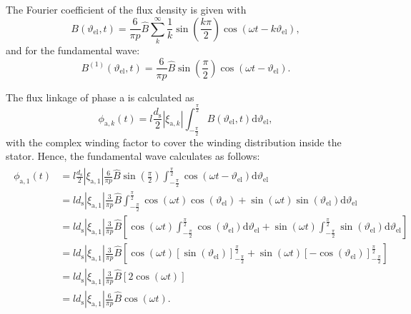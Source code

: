 \begin{solutionblock}
    The Fourier coefficient of the flux density is given with
    \begin{equation}
        B(\vartheta_{\mathrm{el}},t) = \frac{6}{\pi p} \hat{B} \sum_{k}^{\infty} \frac{1}{k} \sin\left(\frac{k\pi}{2} \right) \cos(\omega t - k \vartheta_{\mathrm{el}}),
    \end{equation}
    and for the fundamental wave:
    \begin{equation}
        B^{(1)}(\vartheta_{\mathrm{el}},t) = \frac{6}{\pi p} \hat{B} \sin\left(\frac{\pi}{2}\right) \cos(\omega t - \vartheta_{\mathrm{el}}).
    \end{equation}

    The flux linkage of phase a is calculated as
    \begin{equation}
        \phi_{\mathrm{a,}k}(t) = l \frac{d_{\mathrm{s}}}{2} |\xi_{\mathrm{a},k}| \int_{-\frac{\pi}{2}}^{\frac{\pi}{2}} B(\vartheta_{\mathrm{el}},t) \mathrm{d}\vartheta_{\mathrm{el}},
        \label{eq:phi_a_k}
    \end{equation}
    with the complex winding factor to cover the winding distribution inside the stator.
    Hence, the fundamental wave calculates as follows:
    \begin{align}
        \begin{split}
            \phi_{\mathrm{a,}1}(t) &= l \frac{d_{\mathrm{s}}}{2} |\xi_{\mathrm{a},1}|
            \frac{6}{\pi p} \hat{B} \sin\left(\frac{\pi}{2}\right) \int_{-\frac{\pi}{2}}^{\frac{\pi}{2}} \cos(\omega t - \vartheta_{\mathrm{el}}) \mathrm{d}\vartheta_{\mathrm{el}} \\
            &= l d_{\mathrm{s}} |\xi_{\mathrm{a},1}|
            \frac{3}{\pi p} \hat{B}
            \int_{-\frac{\pi}{2}}^{\frac{\pi}{2}}\cos(\omega t) \cos(\vartheta_{\mathrm{el}}) + \sin(\omega t) \sin(\vartheta_{\mathrm{el}}) \mathrm{d}\vartheta_{\mathrm{el}} \\
            &= l d_{\mathrm{s}} |\xi_{\mathrm{a},1}|
            \frac{3}{\pi p} \hat{B}
            \left[\cos(\omega t) \int_{-\frac{\pi}{2}}^{\frac{\pi}{2}} \cos(\vartheta_{\mathrm{el}}) \mathrm{d}\vartheta_{\mathrm{el}} + \sin(\omega t) \int_{-\frac{\pi}{2}}^{\frac{\pi}{2}} \sin(\vartheta_{\mathrm{el}}) \mathrm{d} \vartheta_{\mathrm{el}} \right] \\
            &= l d_{\mathrm{s}} |\xi_{\mathrm{a},1}|
            \frac{3}{\pi p} \hat{B}
            \left[\cos(\omega t) \left[\sin(\vartheta_{\mathrm{el}}) \right]_{-\frac{\pi}{2}}^{\frac{\pi}{2}} + \sin(\omega t) \left[-\cos(\vartheta_{\mathrm{el}}) \right]_{-\frac{\pi}{2}}^{\frac{\pi}{2}} \right] \\
            &= l d_{\mathrm{s}} |\xi_{\mathrm{a},1}|
            \frac{3}{\pi p} \hat{B} \left[ 2 \cos(\omega t)\right] \\
            &= l d_{\mathrm{s}} |\xi_{\mathrm{a},1}|
            \frac{6}{\pi p} \hat{B} \cos(\omega t). \\
        \end{split}
    \end{align}


\end{solutionblock}

